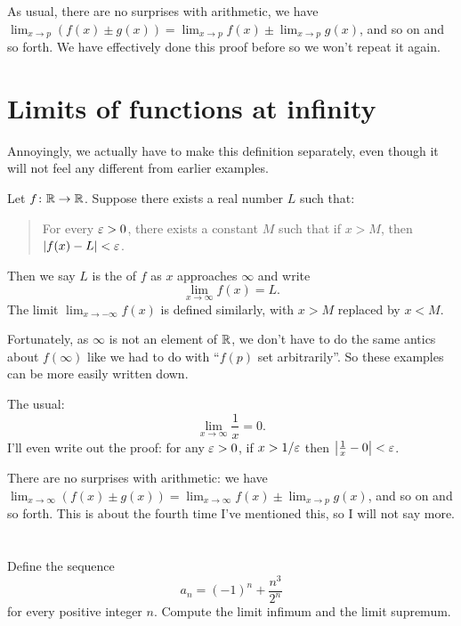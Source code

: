 As usual, there are no surprises with arithmetic,
we have $\lim_{x \to p} (f(x) \pm g(x))
	= \lim_{x \to p} f(x) \pm \lim_{x \to p} g(x)$,
and so on and so forth.
We have effectively done this proof before
so we won't repeat it again.

\section{Limits of functions at infinity}
Annoyingly, we actually have to make this
definition separately,
even though it will not feel any different
from earlier examples.
\begin{definition}
	Let $f \colon \mathbb R \to \mathbb R$.
	Suppose there exists a real number $L$ such that:
	\begin{quote}
		For every $\varepsilon > 0$, there exists a constant $M$
		such that if $x > M$, then $\left\lvert f(x)-L \right\rvert < \varepsilon$.
	\end{quote}
	Then we say $L$ is the  of $f$ as
	$x$ approaches $\infty$ and write
	\[ \lim_{x \to \infty} f(x) = L. \]
	The limit $\lim_{x \to -\infty} f(x)$ is defined similarly,
	with $x > M$ replaced by $x < M$.
\end{definition}
Fortunately, as $\infty$ is not an element of $\mathbb R$,
we don't have to do the same antics about $f(\infty)$
like we had to do with ``$f(p)$ set arbitrarily''.
So these examples can be more easily written down.
\begin{example}
	The usual:
	\[ \lim_{x \to \infty} \frac 1x = 0. \]
	I'll even write out the proof:
	for any $\varepsilon > 0$, if $x > 1/\varepsilon$
	then $\left\lvert \frac 1x - 0 \right\rvert < \varepsilon$.
\end{example}

There are no surprises with arithmetic:
we have $\lim_{x \to \infty} (f(x) \pm g(x))
	= \lim_{x \to \infty} f(x) \pm \lim_{x \to p} g(x)$,
and so on and so forth.
This is about the fourth time
I've mentioned this, so I will not say more.

\section{\problemhead}

\begin{problem}
	Define the sequence
	\[ a_n = (-1)^n + \frac{n^3}{2^n} \]
	for every positive integer $n$.
	Compute the limit infimum and the limit supremum.
\end{problem}

